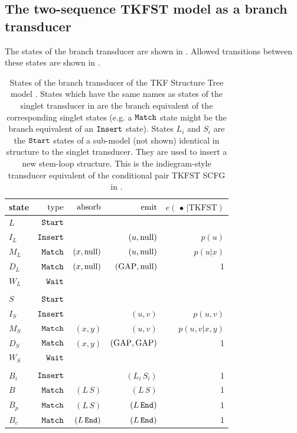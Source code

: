 \documentclass[10pt]{article}
\begin{document}
\subsection{The two-sequence TKFST model as a branch transducer}

The states of the branch transducer are shown in .
Allowed transitions between these states are shown in .

\begin{table}[!ht]
  \centering
  \begin{tabular}{lrrrr}
    state & $\operatorname{type}$ & $\operatorname{absorb}$ & $\operatorname{emit}$ & $e(\,\bullet\,|\mathrm{TKFST})$ \\ \hline
    $L$ & $\mathtt{Start}$ \\
    $I_L$ & $\mathtt{Insert}$ & & $(u,\mathrm{null})$ & $p(u)$ \\
    $M_L$ & $\mathtt{Match}$ & $(x,\mathrm{null})$ & $(u,\mathrm{null})$ & $p(u|x)$ \\
    $D_L$ & $\mathtt{Match}$ & $(x,\mathrm{null})$ & $(\mathrm{GAP},\mathrm{null})$ & 1 \\
    $W_L$ & $\mathtt{Wait}$ \\
    \\
    $S$ & $\mathtt{Start}$ \\
    $I_S$ & $\mathtt{Insert}$ & & $(u,v)$ & $p(u,v)$ \\
    $M_S$ & $\mathtt{Match}$ & $(x,y)$ & $(u,v)$ & $p(u,v|x,y)$ \\
    $D_S$ & $\mathtt{Match}$ & $(x,y)$ & $(\mathrm{GAP},\mathrm{GAP})$ & 1 \\
    $W_S$ & $\mathtt{Wait}$ \\
    \\
    $B_i$ & $\mathtt{Insert}$ & & $(L_i\,S_i)$ & 1 \\
    $B$ & $\mathtt{Match}$ & $(L\,S)$ & $(L\,S)$ & 1 \\
    $B_p$ & $\mathtt{Match}$ & $(L\,S)$ & $(L\,\mathtt{End})$ & 1 \\
    $B_e$ & $\mathtt{Match}$ & $(L\,\mathtt{End})$ & $(L\,\mathtt{End})$ & 1 \\
  \end{tabular}
  \caption{
    States of the branch transducer of the TKF Structure Tree model \cite{Holmes2004}.
    States which have the same names as states of the singlet transducer in 
    are the branch equivalent of the corresponding singlet states
    (e.g. a $\mathtt{Match}$ state might be the branch equivalent of an $\mathtt{Insert}$ state).
    States $L_i$ and $S_i$ are the $\mathtt{Start}$ states of a sub-model (not shown) identical
    in structure to the singlet transducer.  They are used to insert a new stem-loop structure.
    This is the indiegram-style transducer equivalent of the conditional pair TKFST SCFG in .
  }
\end{table}
\end{document}
